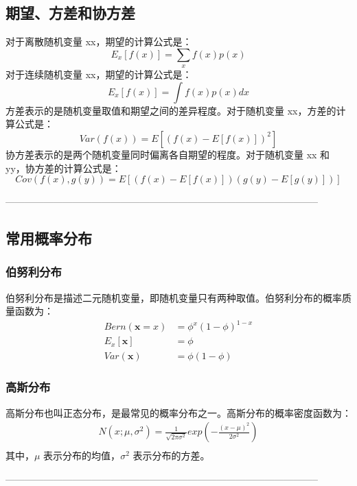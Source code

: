 \documentclass{article}
\begin{document}
\subsection{期望、方差和协方差}
对于离散随机变量 xx，期望的计算公式是：
\begin{equation}
E_{x}[f(x)] = \sum_x f(x)p(x)
\end{equation}
对于连续随机变量 xx，期望的计算公式是：
\begin{equation}
E_{x}[f(x)] = \int f(x)p(x)dx
\end{equation}
方差表示的是随机变量取值和期望之间的差异程度。对于随机变量 xx，方差的计算公式是：
\begin{equation}
Var(f(x)) = E[(f(x) - E[f(x)])^2]
\end{equation}
协方差表示的是两个随机变量同时偏离各自期望的程度。对于随机变量 xx 和 yy，协方差的计算公式是：
\begin{equation}
Cov(f(x), g(y)) = E[(f(x) - E[f(x)])(g(y) - E[g(y)])]
\end{equation}

--------------------------------------------------------------------------------------------------

\subsection{常用概率分布}
\subsubsection{伯努利分布}
伯努利分布是描述二元随机变量，即随机变量只有两种取值。伯努利分布的概率质量函数为：
$$
\begin{aligned}
Bern(\mathbf{x}=x) &= \phi^x(1-\phi)^{1-x} \\
E_{x}[\mathbf{x}] &= \phi \\
Var(\mathbf{x}) &= \phi(1-\phi)
\end{aligned}
$$
\subsubsection{高斯分布}
高斯分布也叫正态分布，是最常见的概率分布之一。高斯分布的概率密度函数为：
$$
\begin{aligned}
N(x;\mu, \sigma^2) = \frac{1}{\sqrt{2\pi\sigma^2}} exp (-\frac{(x-\mu)^2}{2\sigma^2} ) \\
\end{aligned}
$$
其中，$\mu$ 表示分布的均值，$\sigma^2$ 表示分布的方差。

--------------------------------------------------------------------------------------------------
\end{document}
